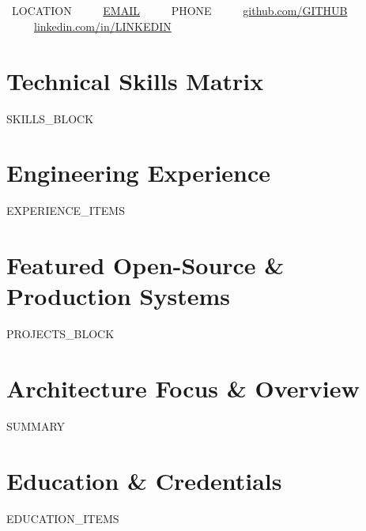 \documentclass[10pt,letterpaper]{article}
\begin{document}
\begin{center}
  {\Huge \textbf{}} \\[3pt]
  {\normalsize \textbf{}} \\[5pt]
  \small
  \faMapMarker* \ {{LOCATION}} \ \ \textbar\ \ 
  \faEnvelope \ \href{mailto:{{EMAIL}}}{{{EMAIL}}} \ \ \textbar\ \ 
  \faPhone \ {{PHONE}} \ \ \textbar\ \ 
  \faGithub \ \href{https://{{GITHUB}}}{github.com/{{GITHUB}}} \ \ \textbar\ \ 
  \faLinkedin \ \href{https://{{LINKEDIN}}}{linkedin.com/in/{{LINKEDIN}}}
\end{center}

\vspace{-2pt}

\section{Technical Skills Matrix}
\small
{{SKILLS_BLOCK}}

\section{Engineering Experience}
\small
{{EXPERIENCE_ITEMS}}

\section{Featured Open-Source \& Production Systems}
\small
{{PROJECTS_BLOCK}}

\section{Architecture Focus \& Overview}
\small
{{SUMMARY}}

\section{Education \& Credentials}
\small
{{EDUCATION_ITEMS}}
\end{document}

